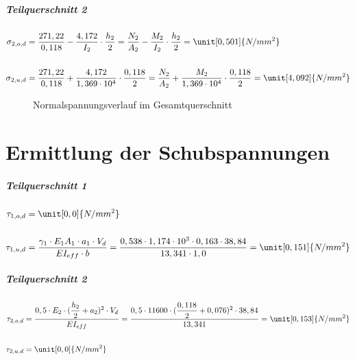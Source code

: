 \subparagraph{Teilquerschnitt 2}
\begin{align*}
\sigma_{2,o,d}&=\dfrac{271,22}{0,118}-\dfrac{4,172}{I_{2}} \cdot \dfrac{h_{2}}{2}=\dfrac{N_{2}}{A_{2}}-\dfrac{M_{2}}{I_{2}} \cdot \dfrac{h_{2}}{2}=\unit[0,501]{N/mm^{2}}\\\\
\sigma_{2,u,d}&=\dfrac{271,22}{0,118}+\dfrac{4,172}{1,369 \cdot 10^{4}} \cdot \dfrac{0,118}{2}=\dfrac{N_{2}}{A_{2}}+\dfrac{M_{2}}{1,369 \cdot 10^{4}} \cdot \dfrac{0,118}{2}=\unit[4,092]{N/mm^{2}}
\end{align*}



\begin{figure}[h!]
\begin{center}
\caption{Normalspannungsverlauf im Gesamtquerschnitt}
\label{normalspannungen}
\end{center}
\end{figure}







\section{Ermittlung der Schubspannungen}
\subparagraph{Teilquerschnitt 1}



\begin{align*}
\tau_{1,o,d}& =\unit[0,0]{N/mm^{2}}\\\\
\tau_{1,u,d}& =\dfrac{\gamma_{1} \cdot E_{1}A_{1} \cdot a_{1} \cdot V_{d}}{EI_{eff} \cdot b}= \dfrac{0,538 \cdot 1,174 \cdot 10^{3} \cdot 0,163 \cdot 38,84}{13,341 \cdot 1,0}= \unit[0,151]{N/mm^{2}}\\
\end{align*}

\subparagraph{Teilquerschnitt 2}
\begin{align*}
\tau_{2,o,d}& =\dfrac{0,5 \cdot E_{2} \cdot (\dfrac{h_{2}}{2}+a_{2})^{2} \cdot V_{d} }{EI_{eff}}=\dfrac{0,5 \cdot 11600 \cdot (\dfrac{0,118}{2}+0,076)^{2} \cdot 38,84}{13,341}=\unit[0,153]{N/mm^{2}}\\\\
\tau_{2,u,d}& =\unit[0,0]{N/mm^{2}}\\
\end{align*}



